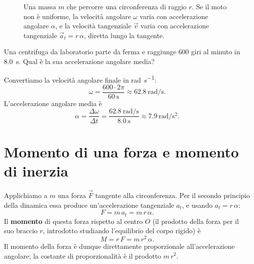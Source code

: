 \begin{figure}[!htbp]
    \centering
    \caption{Una massa $m$ che percorre una circonferenza di raggio $r$. Se il moto non è uniforme, la velocità angolare $\omega$ varia con accelerazione angolare $\alpha$, e la velocità tangenziale $\vec v$ varia con accelerazione tangenziale $\vec a_t = r\,\alpha$, diretta lungo la tangente.}
    \label{fig:acc-angolare}
\end{figure}

\begin{testexample}
Una centrifuga da laboratorio parte da ferma e raggiunge \SI{600}{} giri al minuto in \SI{8,0}{\second}. Qual è la sua accelerazione angolare media?

Convertiamo la velocità angolare finale in \si{\radian\per\second}:
\[ \omega = \frac{600 \cdot 2\pi}{\SI{60}{\second}} \approx \SI{62,8}{\radian\per\second}. \]
L'accelerazione angolare media è
\[ \alpha = \frac{\Delta\omega}{\Delta t} = \frac{\SI{62,8}{\radian\per\second}}{\SI{8,0}{\second}} \approx \SI{7,9}{\radian\per\second\squared}. \]
\end{testexample}

\section[Momento di inerzia]{Momento di una forza e momento di inerzia}

Applichiamo a $m$ una forza $\vec F$ tangente alla circonferenza. Per il secondo principio della dinamica essa produce un'accelerazione tangenziale $a_t$, e usando $a_t = r\,\alpha$:
\[ F = m\,a_t = m\,r\,\alpha. \]
Il \textbf{momento} di questa forza rispetto al centro $O$ (il prodotto della forza per il suo braccio $r$, introdotto studiando l'equilibrio del corpo rigido) è
\[ M = r\,F = m\,r^2\,\alpha. \]
Il momento della forza è dunque direttamente proporzionale all'accelerazione angolare; la costante di proporzionalità è il prodotto $m\,r^2$.

